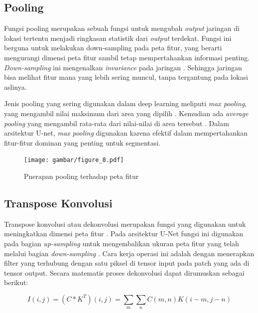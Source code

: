 \subsection{Pooling}

\noindent Fungsi pooling merupakan sebuah fungsi untuk mengubah \textit{output} jaringan di lokasi tertentu menjadi ringkasan statistik dari \textit{output} terdekat\cite{goodfellow_deep_2016,bishop_deep_2024}. Fungsi ini berguna untuk melakukan down-sampling pada peta fitur, yang berarti mengurangi dimensi peta fitur sambil tetap mempertahankan informasi penting. \textit{Down-sampling} ini mengenalkan \textit{invariance} pada jaringan \cite{goodfellow_deep_2016}. Sehingga jaringan bisa melihat fitur mana yang lebih sering muncul, tanpa tergantung pada lokasi aslinya.

\noindent Jenis pooling yang sering digunakan dalam deep learning meliputi \textit{max pooling}, yang mengambil nilai maksimum dari area yang dipilih \cite{bishop_deep_2024}. Kemudian ada \textit{average pooling} yang mengambil rata-rata dari nilai-nilai di area tersebut \cite{bishop_deep_2024}. Dalam arsitektur U-net, \textit{max pooling} digunakan karena efektif dalam mempertahankan fitur-fitur dominan yang penting untuk segmentasi.

\begin{figure}[H]
	\centering
	\texttt{[image: gambar/figure\_8.pdf]}
	\caption{Pnerapan pooling terhadap peta fitur \cite{bishop_deep_2024}}
	\label{fig:pooling}
\end{figure}

\subsection{Transpose Konvolusi}


\noindent Transpose konvolusi atau dekonvolusi merupakan fungsi yang digunakan untuk meningkatkan dimensi peta fitur \cite{goodfellow_deep_2016,bishop_deep_2024}. Pada arsitektur U-Net fungsi ini digunakan pada bagian \textit{up-sampling} untuk mengembalikan ukuran peta fitur yang telah melalui bagian \textit{down-sampling} \cite{azad_medical_2022}. Cara kerja operasi ini adalah dengan menerapkan filter yang terhubung dengan satu piksel di tensor input pada patch yang ada di tensor output. Secara matematis proses dekonvolusi dapat dirumuskan sebagai berikut:

\begin{equation}
	I(i,j) = (C * K^T)(i,j) = \sum_{m} \sum_{n} C(m, n) K(i - m, j - n)
\end{equation}

